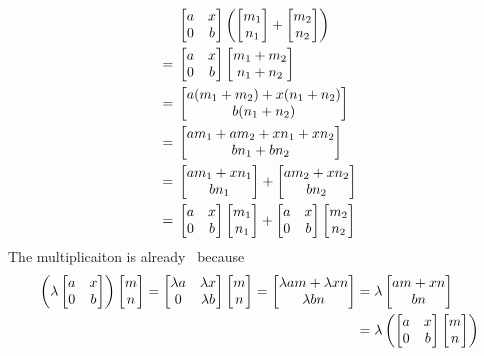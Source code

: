 \begin{align*}
  {}&
  \begin{bmatrix}
    a & x \\
    0 & b
  \end{bmatrix}
  \left(
      \begin{bmatrix}  m_1 \\ n_1  \end{bmatrix}
    + \begin{bmatrix}  m_2 \\ n_2  \end{bmatrix}
  \right)
  \\
  ={}&
  \begin{bmatrix}
    a & x \\
    0 & b
  \end{bmatrix}
  \begin{bmatrix}  m_1 + m_2 \\ n_1 + n_2  \end{bmatrix}
  \\
  ={}&
  \begin{bmatrix}  a (m_1 + m_2) + x (n_1 + n_2) \\ b (n_1 + n_2)  \end{bmatrix}
  \\
  ={}&
  \begin{bmatrix}  a m_1 + a m_2 + x n_1 + x n_2 \\ b n_1 + b n_2  \end{bmatrix}
  \\
  ={}&
    \begin{bmatrix}  a m_1 + x n_1 \\ b n_1  \end{bmatrix}
  + \begin{bmatrix}  a m_2 + x n_2 \\ b n_2  \end{bmatrix}
  \\
  ={}&
  \begin{bmatrix}
    a & x \\
    0 & b
  \end{bmatrix}
  \begin{bmatrix}  m_1 \\ n_1  \end{bmatrix}
  +
  \begin{bmatrix}
    a & x \\
    0 & b
  \end{bmatrix}
  \begin{bmatrix}  m_2 \\ n_2  \end{bmatrix}
\end{align*}
The multiplicaiton is already~{\kbil} because
\begin{align*}
  \left(
    \lambda
    \begin{bmatrix}
      a & x \\
      0 & b
    \end{bmatrix}
  \right)
  \begin{bmatrix}  m \\ n  \end{bmatrix}
  =
  \begin{bmatrix}
    \lambda a & \lambda x \\
    0         & \lambda b
  \end{bmatrix}
  \begin{bmatrix}  m \\ n  \end{bmatrix}
  =
  \begin{bmatrix} \lambda a m + \lambda x n \\ \lambda b n \end{bmatrix}
  &=
  \lambda \begin{bmatrix} a m + x n \\ b n \end{bmatrix}
  \\
  &=
  \lambda
  \left(
    \begin{bmatrix}
      a & x \\
      0 & b
    \end{bmatrix}
    \begin{bmatrix}  m \\ n  \end{bmatrix}
  \right)
\end{align*}
